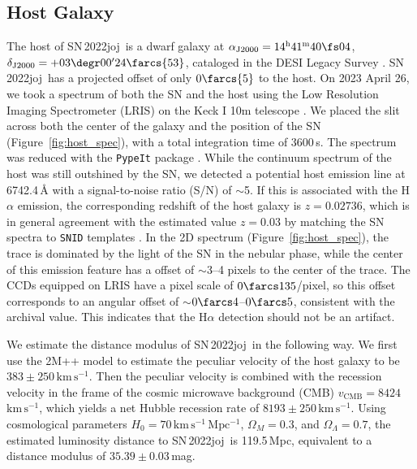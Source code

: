\documentclass[twocolumn]{aastex631}
\newcommand{\sn}{SN\,2022joj}
\newcommand{\kms}{$\mathrm{km}\,\mathrm{s}^{-1}$}
\begin{document}
\begin{CJK*}{UTF8}{gbsn}
\subsection{Host Galaxy}
The host of \sn\ is a dwarf galaxy at $\alpha_\mathrm{J2000}=14^\mathrm{h}41^\mathrm{m}40\fs04$, $\delta_\mathrm{J2000}=+03\degr00'24\farcs{53}$, cataloged in the DESI Legacy Survey \citep[LS;][]{Dey_LS_2019}. \sn\ has a projected offset of only $0\farcs{5}$ to the host. On 2023 April 26, we took a spectrum of both the SN and the host using the Low Resolution Imaging Spectrometer (LRIS) on the Keck I 10m telescope \citep{Keck_1995}. We placed the slit across both the center of the galaxy and the position of the SN (Figure~\ref{fig:host_spec}), with a total integration time of 3600\,s. The spectrum was reduced with the \texttt{PypeIt} package \citep{pypeit:joss_pub}. While the continuum spectrum of the host was still outshined by the SN, we detected a potential host emission line at 6742.4\,\r{A} with a signal-to-noise ratio (S/N) of $\sim$5. If this is associated with the H$\alpha$ emission, the corresponding redshift of the host galaxy is $z=0.02736$, which is in general agreement with the estimated value $z=0.03$ by matching the SN spectra to \texttt{SNID} templates \citep{Newsome_2022TNSCR}. In the 2D spectrum (Figure~\ref{fig:host_spec}), the trace is dominated by the light of the SN in the nebular phase, while the center of this emission feature has a offset of $\sim$3--4 pixels to the center of the trace. The CCDs equipped on LRIS have a pixel scale of $0\farcs135$/pixel, so this offset corresponds to an angular offset of $\sim$$0\farcs4$--$0\farcs5$, consistent with the archival value. This indicates that the H$\alpha$ detection should not be an artifact.

We estimate the distance modulus of \sn\ in the following way. We first use the 2M++ model \citep{Carrick2015_2M++} to estimate the peculiar velocity of the host galaxy to be $383\pm250$\,\kms. Then the peculiar velocity is combined with the recession velocity in the frame of the cosmic microwave background (CMB) $v_\mathrm{CMB}=8424$\,\kms, which yields a net Hubble recession rate of $8193\pm250$\,\kms. Using cosmological parameters $H_0 = 70\,\mathrm{km\,s^{-1}\,Mpc^{-1}}$, $\Omega_M=0.3$, and $\Omega_\Lambda=0.7$, the estimated luminosity distance to \sn\ is 119.5\,Mpc, equivalent to a distance modulus of $35.39\pm0.03$\,mag.


\end{CJK*}
\end{document}
